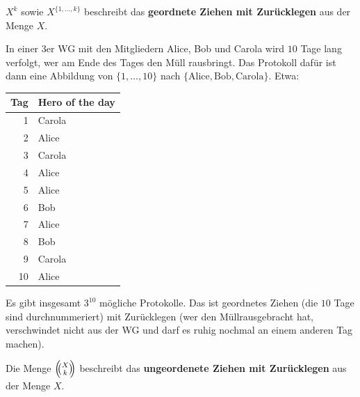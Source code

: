 \begin{bem}
	 $X^k$ sowie $X^{\{1,\ldots,k\}}$ beschreibt das \textbf{geordnete Ziehen mit Zurücklegen} aus der Menge $X$. 
\end{bem}

\begin{bsp} \label{wg:muell} 
In einer $3$er WG mit den Mitgliedern Alice, Bob und Carola wird $10$ Tage lang verfolgt, wer am Ende des Tages den Müll rausbringt. Das Protokoll dafür ist dann eine Abbildung von $\{1,\ldots,10\}$ nach $\{\text{Alice},\text{Bob},\text{Carola} \}$.  Etwa: 
\begin{center}
\begin{tabular}{r|l}
	Tag & Hero of the day
	\\  \hline 
	 1 & Carola
	\\ 2 & Alice
	\\ 3 & Carola
	\\ 4 & Alice
	\\ 5 & Alice
	\\ 6 & Bob
	\\ 7 & Alice
	\\ 8 & Bob
	\\ 9 & Carola
	\\ 10 & Alice
\end{tabular} 
\end{center} 

Es gibt insgesamt $3^{10}$ mögliche Protokolle. Das ist geordnetes Ziehen (die $10$  Tage sind durchnummeriert) mit Zurücklegen (wer den Müllrausgebracht hat, verschwindet  nicht aus der WG und darf es ruhig nochmal an einem anderen Tag machen). 
\end{bsp} 

\begin{bem}
		 Die Menge $\left(\!\!\binom{X}{k}\!\!\right)$ beschreibt das \textbf{ungeordenete Ziehen mit Zurücklegen} aus der Menge $X$. 
\end{bem} 

